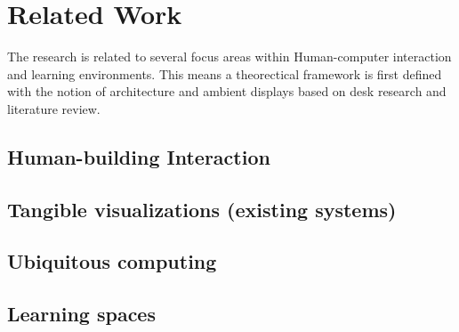 \section{Related Work}

The research is related to several focus areas within Human-computer interaction and learning environments. This means a theorectical framework is first defined with the notion of architecture and ambient displays based on desk research and literature review.

\subsection{Human-building Interaction}

\subsection{Tangible visualizations (existing systems)}

\subsection{Ubiquitous computing}

\subsection{Learning spaces}